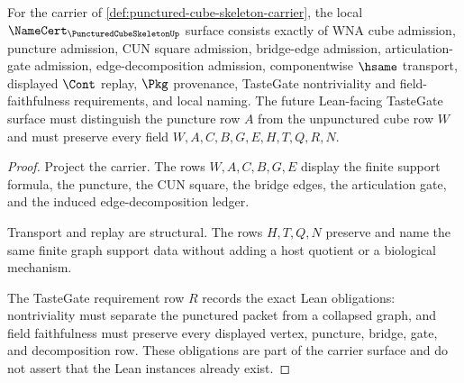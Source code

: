\begin{theorem}
\label{thm:punctured-cube-skeleton-namecert-obligations}
For the carrier of \autoref{def:punctured-cube-skeleton-carrier}, the local $\NameCert_{\PuncturedCubeSkeletonUp}$ surface consists exactly of WNA cube admission, puncture admission, CUN square admission, bridge-edge admission, articulation-gate admission, edge-decomposition admission, componentwise $\hsame$ transport, displayed $\Cont$ replay, $\Pkg$ provenance, TasteGate nontriviality and field-faithfulness requirements, and local naming. The future Lean-facing TasteGate surface must distinguish the puncture row $A$ from the unpunctured cube row $W$ and must preserve every field $W,A,C,B,G,E,H,T,Q,R,N$.
\end{theorem}
\begin{proof}
Project the carrier. The rows $W,A,C,B,G,E$ display the finite support formula, the puncture, the CUN square, the bridge edges, the articulation gate, and the induced edge-decomposition ledger.

Transport and replay are structural. The rows $H,T,Q,N$ preserve and name the same finite graph support data without adding a host quotient or a biological mechanism.

The TasteGate requirement row $R$ records the exact Lean obligations: nontriviality must separate the punctured packet from a collapsed graph, and field faithfulness must preserve every displayed vertex, puncture, bridge, gate, and decomposition row. These obligations are part of the carrier surface and do not assert that the Lean instances already exist.
\end{proof}

